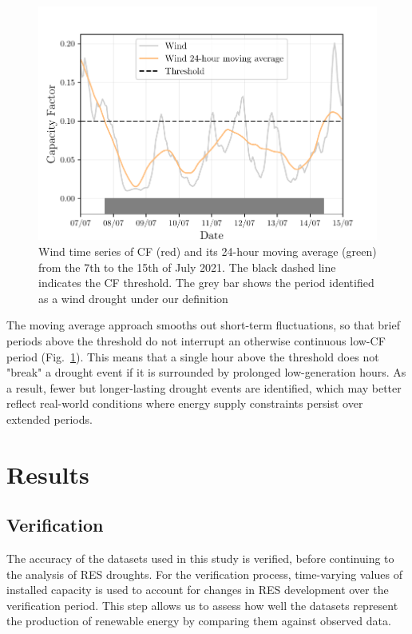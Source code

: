 \documentclass[a4paper, 11pt]{article}
\begin{document}
\begin{figure}[ht!]
	\centering
	\includegraphics{droughts_methodology}
	\caption{Wind time series of CF (red) and its 24-hour moving average (green) from the 7th to the 15th of July 2021. The black dashed line indicates the CF threshold. The grey bar shows the period identified as a wind drought under our definition}
	\label{fig:find_res_droughts}
\end{figure}

The moving average approach smooths out short-term fluctuations, so that brief periods above the threshold do not interrupt an otherwise continuous low-CF period (Fig.~\ref{fig:find_res_droughts}). This means that a single hour above the threshold does not "break" a drought event if it is surrounded by prolonged low-generation hours. As a result, fewer but longer-lasting drought events are identified, which may better reflect real-world conditions where energy supply constraints persist over extended periods.

\section{Results}
\label{sec:Results}

\subsection{Verification}
\label{sec:verification}

The accuracy of the datasets used in this study is verified, before continuing to the analysis of RES droughts. For the verification process, time-varying values of installed capacity is used to account for changes in RES development over the verification period. This step allows us to assess how well the datasets represent the production of renewable energy by comparing them against observed data.
\end{document}
